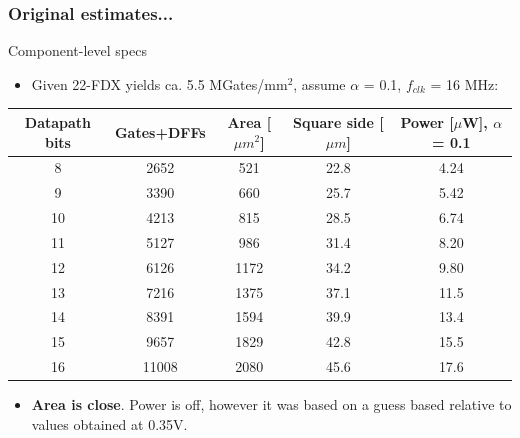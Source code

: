 \documentclass[t, screen, aspectratio=43]{beamer}
\begin{document}
\begin{frame}
	\frametitle{\color{red}Original estimates...}
	\begin{block}{Component-level specs}
		\scriptsize
		\begin{itemize}[itemsep=4pt,label=\protect---]
			\scriptsize
			\item Given 22-FDX yields ca. 5.5 MGates/mm$^2$, assume $\alpha$ = 0.1, $f_{clk}$ = 16 MHz:
		\end{itemize} 
	\vspace{-1em}
	\begin{table}[h!]
		\centering
		\def\arraystretch{1.5}		
		\setlength\arrayrulewidth{0.75pt}
		\setlength{\tabcolsep}{1em} %
		\tiny
		\begin{tabular}{|c|c|c|c|c|}
			\hline 
			\rule[-1ex]{0pt}{2.5ex} \cellcolor{gray!40}\textbf{Datapath bits} & \cellcolor{gray!40}\textbf{Gates+DFFs} & \cellcolor{gray!40}\textbf{Area} [$\mu m^2$] & \cellcolor{gray!40}\textbf{Square side [$\mu m$]} &  \cellcolor{gray!40}\textbf{Power} [$\mu$W], $\alpha$ = 0.1\\ 
			\hline 
			\rule[-1ex]{0pt}{2.5ex} 8 & 2652 & 521 & 22.8 & 4.24 \\ 
			\hline 
			\rule[-1ex]{0pt}{2.5ex} 9 & 3390 & 660 & 25.7 & 5.42 \\ 
			\hline 
			\rule[-1ex]{0pt}{2.5ex} 10 & 4213 & 815 & 28.5 & 6.74 \\ 
			\hline 
			\rule[-1ex]{0pt}{2.5ex} 11 & 5127 & 986 & 31.4 & 8.20 \\ 
			\hline 
			\rule[-1ex]{0pt}{2.5ex} 12 & 6126 & 1172 & 34.2 & 9.80 \\ 
			\hline 
			\rule[-1ex]{0pt}{2.5ex} 13 & 7216 & 1375 & 37.1 & 11.5 \\ 
			\hline 
			\rule[-1ex]{0pt}{2.5ex} 14 & 8391 & 1594& 39.9 & 13.4 \\ 
			\hline 
			\rule[-1ex]{0pt}{2.5ex} 15 & 9657 & 1829 & 42.8 & 15.5 \\ 
			\hline 
			\rule[-1ex]{0pt}{2.5ex} \cellcolor{yellow}16 & \cellcolor{yellow}11008 & \cellcolor{yellow}2080 & \cellcolor{yellow}45.6 & \cellcolor{yellow}17.6 \\ 
			\hline 
		\end{tabular} 
		\label{design_specs}
	\end{table}   
		\scriptsize
		\vspace{-1em}
		\begin{itemize}[itemsep=4pt,label=\protect---]
			\scriptsize
			\item \textbf{Area is close}. Power is off, however it was based on a guess based relative to values obtained at 0.35V.
		\end{itemize} 
	\end{block}    
\end{frame}
\end{document}
